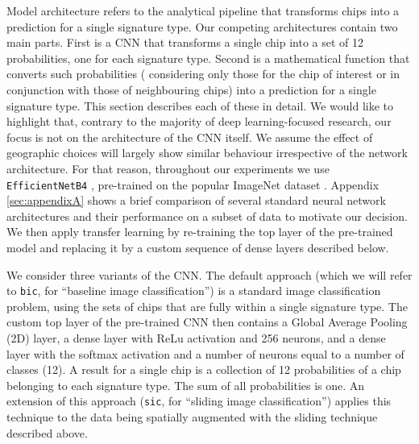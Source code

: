Model architecture refers to the analytical pipeline that transforms chips
into a prediction for a single signature type. Our competing architectures
contain two main parts. First is a CNN that transforms a single chip into a
set of 12 probabilities, one for each signature type.
Second is a mathematical function that converts such probabilities (
considering only those for the chip of interest or in conjunction with
those of neighbouring chips) into a
prediction for a single signature type. This section describes each of these in detail.
We would like to highlight that, contrary to the majority of deep
learning-focused research, our focus is not on the architecture of the CNN
itself. We assume the effect of geographic choices will largely show similar
behaviour irrespective of the network architecture. For that reason, throughout
our experiments we use \texttt{EfficientNetB4} \citep{https://doi.org/10.48550/arxiv.1905.11946}, pre-trained
on the popular ImageNet dataset \citep{deng2009imagenet}. Appendix \ref*{sec:appendixA} shows a brief comparison of
several standard neural network architectures and their performance on a subset of data
to motivate our decision. We then apply transfer learning by re-training the
top layer of the pre-trained model and replacing it by a
custom sequence of dense layers described below.

We consider three variants of the CNN.
The default approach (which we will refer to \texttt{bic}, for ``baseline
image classification'') is a standard image classification problem, using the sets of chips
that are fully within a single signature type. The custom top layer of the pre-trained CNN then contains a Global Average
Pooling (2D) layer, a dense layer with ReLu activation and 256 neurons, and a dense
layer with the softmax activation and a number of neurons equal to a number of classes
(12). A result for a single chip is a collection of 12 probabilities
of a chip belonging to each signature type. The sum of all probabilities is
one.
An extension of this approach (\texttt{sic}, for ``sliding image
classification'') applies this technique to the data being spatially augmented
with the sliding technique described above.


